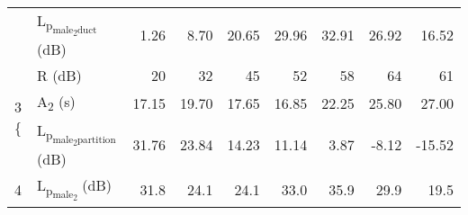 \begin{table}[htbp]
\begin{tabular}{@{}l@{\hspace*{0.5em}}lrrrrrrr@{}}
		& L\textsubscript{p\textsubscript{male\textsubscript{2}duct}} (dB) & 1.26 & 8.70 & 20.65 & 29.96 & 32.91 & 26.92 & 16.52 \\
		\multirow{3}{*}{3 \vast\{ } & R (dB) & 20 & 32 & 45 & 52 & 58 & 64 & 61 \\
		& A\textsubscript{2} (s) & 17.15 & 19.70 & 17.65 & 16.85 & 22.25 & 25.80 & 27.00 \\
		& L\textsubscript{p\textsubscript{male\textsubscript{2}partition}} (dB) & 31.76 & 23.84 & 14.23 & 11.14 & 3.87 & -8.12 & -15.52 \\
		4 & L\textsubscript{p\textsubscript{male\textsubscript{2}}} (dB) & 31.8 & 24.1 & 24.1 & 33.0 & 35.9 & 29.9 & 19.5 \\ \bottomrule
	\end{tabular}
\end{table}